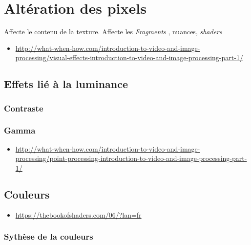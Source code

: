 \documentclass[
  french,
]{book}
\providecommand{\tightlist}{%
  \setlength{\itemsep}{0pt}\setlength{\parskip}{0pt}}
\begin{document}
\hypertarget{altuxe9ration-des-pixels}{%
\section{Altération des pixels}\label{altuxe9ration-des-pixels}}

Affecte le contenu de la texture.
Affecte les \emph{Fragments} , nuances, \emph{shaders}

\begin{itemize}
\tightlist
\item
  \url{http://what-when-how.com/introduction-to-video-and-image-processing/visual-effects-introduction-to-video-and-image-processing-part-1/}
\end{itemize}

\hypertarget{effets-liuxe9-uxe0-la-luminance}{%
\subsection{Effets lié à la luminance}\label{effets-liuxe9-uxe0-la-luminance}}

\hypertarget{contraste}{%
\subsubsection{Contraste}\label{contraste}}

\hypertarget{gamma}{%
\subsubsection{Gamma}\label{gamma}}

\begin{itemize}
\tightlist
\item
  \url{http://what-when-how.com/introduction-to-video-and-image-processing/point-processing-introduction-to-video-and-image-processing-part-1/}
\end{itemize}

\hypertarget{couleurs}{%
\subsection{Couleurs}\label{couleurs}}

\begin{itemize}
\tightlist
\item
  \url{https://thebookofshaders.com/06/?lan=fr}
\end{itemize}

\hypertarget{sythuxe8se-de-la-couleurs}{%
\subsubsection{Sythèse de la couleurs}\label{sythuxe8se-de-la-couleurs}}
\end{document}
